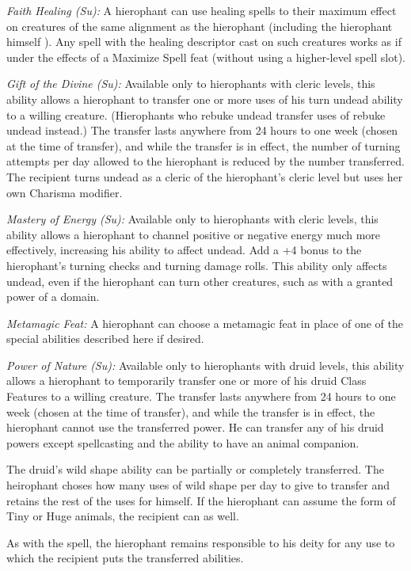 \textit{Faith Healing (Su):} A hierophant can use healing spells to their maximum 
effect on creatures of the same alignment as the hierophant (including the hierophant 
himself ). Any spell with the healing descriptor cast on such creatures works as 
if under the effects of a Maximize Spell feat (without using a higher-level spell 
slot).

\textit{Gift of the Divine (Su):} Available only to hierophants with cleric levels, 
this ability allows a hierophant to transfer one or more uses of his turn undead 
ability to a willing creature. (Hierophants who rebuke undead transfer uses of 
rebuke undead instead.) The transfer lasts anywhere from 24 hours to one week (chosen 
at the time of transfer), and while the transfer is in effect, the number of turning 
attempts per day allowed to the hierophant is reduced by the number transferred. 
The recipient turns undead as a cleric of the hierophant's cleric level but uses 
her own Charisma modifier.

\textit{Mastery of Energy (Su):} Available only to hierophants with cleric levels, 
this ability allows a hierophant to channel positive or negative energy much more 
effectively, increasing his ability to affect undead. Add a +4 bonus to the hierophant's 
turning checks and turning damage rolls. This ability only affects undead, even 
if the hierophant can turn other creatures, such as with a granted power of a domain.

\textit{Metamagic Feat:} A hierophant can choose a metamagic feat in place of one 
of the special abilities described here if desired.

\textit{Power of Nature (Su):} Available only to hierophants with druid levels, 
this ability allows a hierophant to temporarily transfer one or more of his druid 
Class Features to a willing creature. The transfer lasts anywhere from 24 hours 
to one week (chosen at the time of transfer), and while the transfer is in effect, 
the hierophant cannot use the transferred power. He can transfer any of his druid 
powers except spellcasting and the ability to have an animal companion.

The druid's wild shape ability can be partially or completely transferred. The 
heirophant choses how many uses of wild shape per day to give to transfer and retains 
the rest of the uses for himself. If the hierophant can assume the form of Tiny 
or Huge animals, the recipient can as well.

As with the  spell, the hierophant remains responsible 
to his deity for any use to which the recipient puts the transferred abilities.

